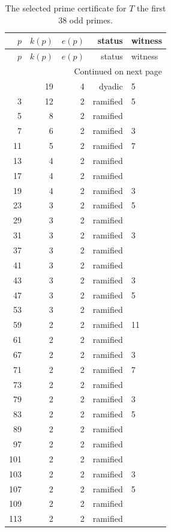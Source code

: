 \small
\begin{longtable}{rrrrl}
\caption{The selected prime certificate for $T$ the first $38$ odd primes.}\label{tab:certificate}\\
\toprule
$p$ & $k(p)$ & $e(p)$ & status & witness \\
\midrule
\endfirsthead
\toprule
$p$ & $k(p)$ & $e(p)$ & status & witness \\
\midrule
\endhead
\midrule
\multicolumn{5}{r}{Continued on next page}\\
\endfoot
\bottomrule
\endlastfoot
2 & 19 & 4 & dyadic & 5 \\
3 & 12 & 2 & ramified & 5 \\
5 & 8 & 2 & ramified &  \\
7 & 6 & 2 & ramified & 3 \\
11 & 5 & 2 & ramified & 7 \\
13 & 4 & 2 & ramified &  \\
17 & 4 & 2 & ramified &  \\
19 & 4 & 2 & ramified & 3 \\
23 & 3 & 2 & ramified & 5 \\
29 & 3 & 2 & ramified &  \\
31 & 3 & 2 & ramified & 3 \\
37 & 3 & 2 & ramified &  \\
41 & 3 & 2 & ramified &  \\
43 & 3 & 2 & ramified & 3 \\
47 & 3 & 2 & ramified & 5 \\
53 & 3 & 2 & ramified &  \\
59 & 2 & 2 & ramified & 11 \\
61 & 2 & 2 & ramified &  \\
67 & 2 & 2 & ramified & 3 \\
71 & 2 & 2 & ramified & 7 \\
73 & 2 & 2 & ramified &  \\
79 & 2 & 2 & ramified & 3 \\
83 & 2 & 2 & ramified & 5 \\
89 & 2 & 2 & ramified &  \\
97 & 2 & 2 & ramified &  \\
101 & 2 & 2 & ramified &  \\
103 & 2 & 2 & ramified & 3 \\
107 & 2 & 2 & ramified & 5 \\
109 & 2 & 2 & ramified &  \\
113 & 2 & 2 & ramified &  \\

\end{longtable}

